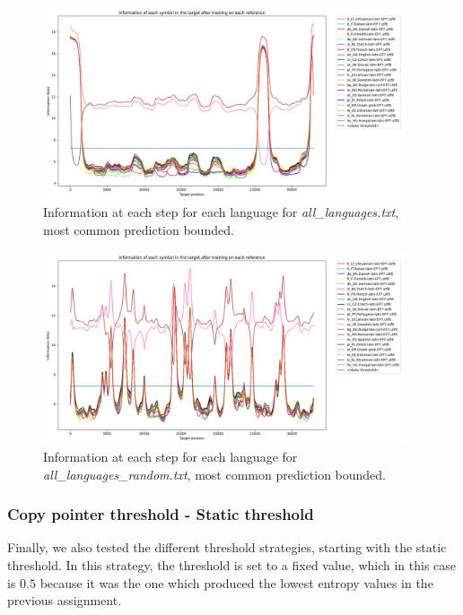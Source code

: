 \documentclass{article}
\begin{document}
\begin{figure}
    \centering
    \includegraphics[width=0.95\textwidth]{../results/all_languages/-r_c:100.png}
    \caption{Information at each step for each language for \textit{all\_languages.txt}, most common prediction bounded.}
    \label{fig:all_languages_r_c}
\end{figure}

\begin{figure}
    \centering
    \includegraphics[width=0.95\textwidth]{../results/all_languages_random/-r_c:100.png}
    \caption{Information at each step for each language for \textit{all\_languages\_random.txt}, most common prediction bounded.}
    \label{fig:all_languages_random_r_c}
\end{figure}

\subsubsection{Copy pointer threshold - Static threshold}
\label{subsubsec:results_locate_lang_static_threshold}

Finally, we also tested the different threshold strategies, starting with the static threshold.
In this strategy, the threshold is set to a fixed value, which in this case is $0.5$ because it was the one which produced the lowest entropy values in the previous assignment.
\end{document}
